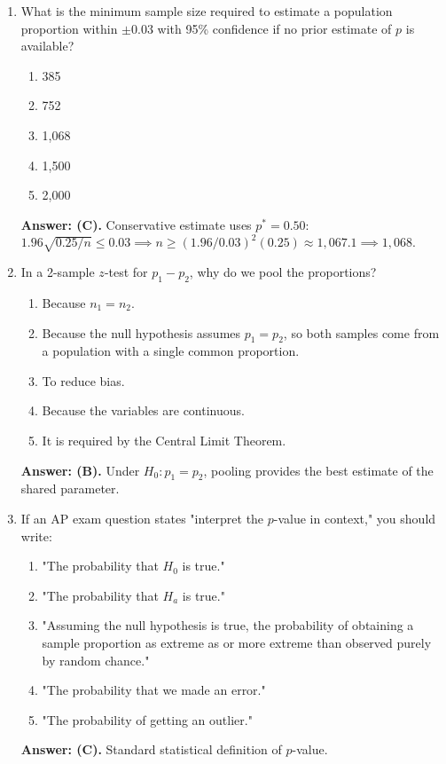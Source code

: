 \begin{enumerate}[resume, leftmargin=1.5em]
  \item What is the minimum sample size required to estimate a population proportion within $\pm 0.03$ with 95\% confidence if no prior estimate of $p$ is available?
  \begin{enumerate}[label=(\Alph*)]
    \item 385 \item 752 \item 1,068 \item 1,500 \item 2,000
  \end{enumerate}
  \textbf{Answer: (C).} Conservative estimate uses $p^* = 0.50$: $1.96 \sqrt{0.25/n} \le 0.03 \implies n \ge (1.96/0.03)^2(0.25) \approx 1,067.1 \implies 1,068$.

  \item In a 2-sample $z$-test for $p_1 - p_2$, why do we pool the proportions?
  \begin{enumerate}[label=(\Alph*)]
    \item Because $n_1 = n_2$.
    \item Because the null hypothesis assumes $p_1 = p_2$, so both samples come from a population with a single common proportion.
    \item To reduce bias.
    \item Because the variables are continuous.
    \item It is required by the Central Limit Theorem.
  \end{enumerate}
  \textbf{Answer: (B).} Under $H_0: p_1 = p_2$, pooling provides the best estimate of the shared parameter.

  \item If an AP exam question states "interpret the $p$-value in context," you should write:
  \begin{enumerate}[label=(\Alph*)]
    \item "The probability that $H_0$ is true."
    \item "The probability that $H_a$ is true."
    \item "Assuming the null hypothesis is true, the probability of obtaining a sample proportion as extreme as or more extreme than observed purely by random chance."
    \item "The probability that we made an error."
    \item "The probability of getting an outlier."
  \end{enumerate}
  \textbf{Answer: (C).} Standard statistical definition of $p$-value.
\end{enumerate}

